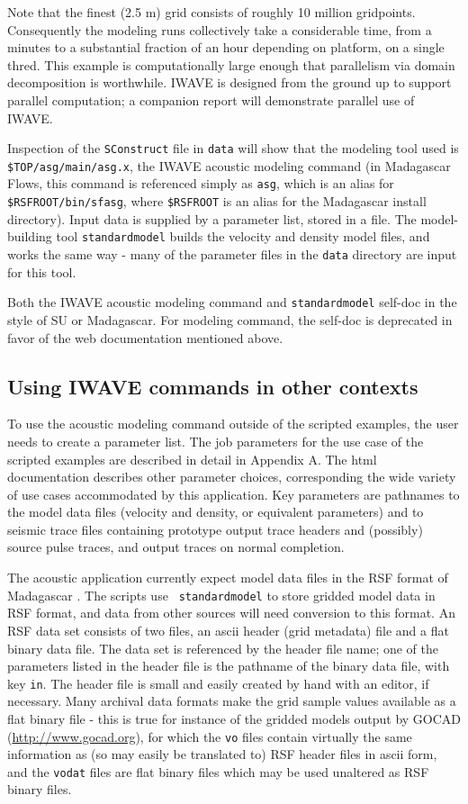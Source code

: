 Note that the finest (2.5 m) grid consists of roughly 10 million
gridpoints. Consequently the modeling runs collectively take a
considerable time, from a minutes to a substantial fraction of an hour
depending on platform,
on a single thred. This example is computationally large enough that
parallelism via domain decomposition is worthwhile. IWAVE is designed
from the ground up to support parallel computation; a companion report
will demonstrate parallel use of IWAVE.

Inspection of the {\tt SConstruct} file in {\tt data} will show that
the modeling tool used is {\tt \$TOP/asg/main/asg.x}, the IWAVE
acoustic modeling command (in Madagascar Flows, this command is referenced
simply as {\tt asg}, which is an alias for {\tt \$RSFROOT/bin/sfasg},
where {\tt \$RSFROOT} is an alias for the Madagascar install
directory). Input data is supplied by a parameter list, stored in a file.
The model-building tool {\tt standardmodel} builds the velocity and
density model files, and works the same way - many of the parameter
files in the {\tt data} directory are input for this tool.

Both the IWAVE acoustic modeling command and {\tt standardmodel}
self-doc in the style of SU or Madagascar. For modeling command, the
self-doc is deprecated in favor of the web documentation mentioned
above.

\subsection{Using IWAVE commands in other contexts}
To use the acoustic modeling command outside of the scripted examples,
the user needs to create a parameter list.  The job parameters for the
use case of the scripted examples are described in detail in Appendix
A. The html documentation \cite[]{IWAVE} describes other parameter
choices, corresponding the wide variety of use cases accommodated by
this application. Key parameters are pathnames to the model data files
(velocity and density, or equivalent parameters) and to seismic trace
files containing prototype output trace headers and (possibly) source
pulse traces, and output traces on normal completion.

The acoustic application currently expect model data files in the RSF
format of Madagascar \cite[]{Madagascar}. The scripts use {\tt
  standardmodel} to store gridded model data in RSF format, and data
from other sources will need conversion to this format. An RSF data
set consists of two files, an ascii header (grid metadata) file and a
flat binary data file. The data set is referenced by the header file
name; one of the parameters listed in the header file is the pathname
of the binary data file, with key {\tt in}. The header file is small
and easily created by hand with an editor, if necessary. Many archival
data formats make the grid sample values available as a flat binary
file - this is true for instance of the gridded models output by GOCAD
(\url{http://www.gocad.org}), for which the {\tt vo} files contain virtually
the same information as (so may easily be translated to) RSF header
files in ascii form, and the {\tt vodat} files are flat binary files
which may be used unaltered as RSF binary files.

